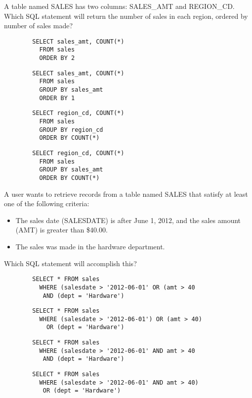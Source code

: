 \documentclass[11pt]{exam}
\begin{document}
\begin{questions}
\question[1]
A table named SALES has two columns: SALES\_AMT and REGION\_CD. Which SQL statement will return the number
of sales in each region, ordered by number of sales made?
\begin{choices}
\choice \begin{verbatim}
		SELECT sales_amt, COUNT(*)
		  FROM sales
		  ORDER BY 2
	 	\end{verbatim}
\choice \begin{verbatim}
		SELECT sales_amt, COUNT(*)
		  FROM sales
		  GROUP BY sales_amt
		  ORDER BY 1
		\end{verbatim}
\choice \begin{verbatim}
		SELECT region_cd, COUNT(*)
		  FROM sales
		  GROUP BY region_cd
		  ORDER BY COUNT(*)
		\end{verbatim}
\choice \begin{verbatim}
		SELECT region_cd, COUNT(*)
		  FROM sales
		  GROUP BY sales_amt
		  ORDER BY COUNT(*)
		\end{verbatim}
\end{choices}

\newpage
\question[1]
A user wants to retrieve records from a table named SALES that satisfy at least one of the following
criteria:
	\begin{itemize}
	\item The sales date (SALESDATE) is after June 1, 2012, and the sales amount (AMT) is greater
	than \$40.00.
	\item The sales was made in the hardware department. 
	\end{itemize}
Which SQL statement will accomplish this?
\begin{choices}
\choice \begin{verbatim}
		SELECT * FROM sales
		  WHERE (salesdate > '2012-06-01' OR (amt > 40
		   AND (dept = 'Hardware')
		\end{verbatim}
\choice \begin{verbatim}
		SELECT * FROM sales
		  WHERE (salesdate > '2012-06-01') OR (amt > 40)
		    OR (dept = 'Hardware')
		\end{verbatim}
\choice \begin{verbatim}
 		SELECT * FROM sales
 		  WHERE (salesdate > '2012-06-01' AND amt > 40
 		   AND (dept = 'Hardware')
		\end{verbatim}
\choice \begin{verbatim}
		SELECT * FROM sales
		  WHERE (salesdate > '2012-06-01' AND amt > 40)
		   OR (dept = 'Hardware')
		\end{verbatim}
\end{choices}


\end{questions}
\end{document}
